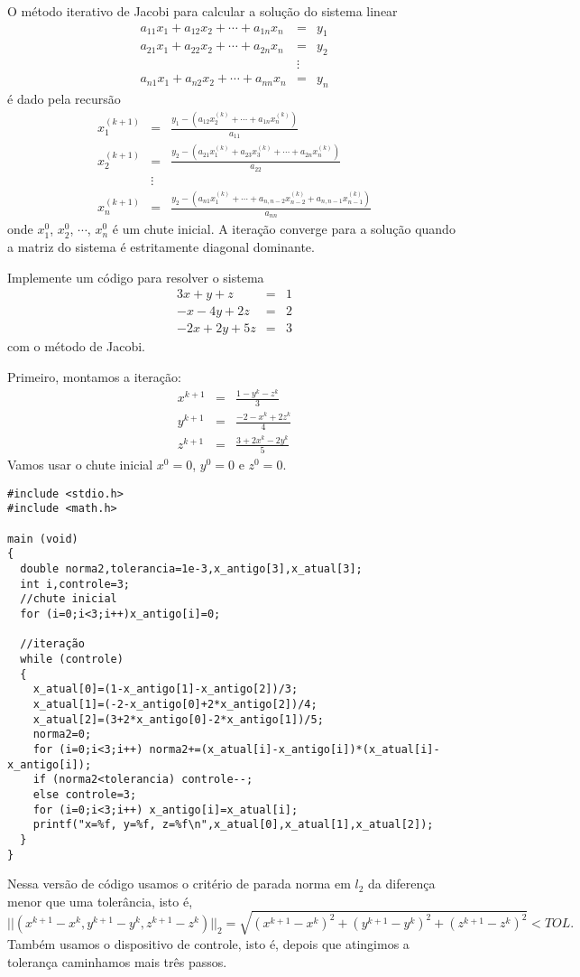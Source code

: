 \begin{ex}\label{ex_Jacobi}O método iterativo de Jacobi para calcular a solução do sistema linear
\begin{eqnarray}
\nonumber a_{11}x_1+a_{12}x_2+\cdots+a_{1n}x_n&=&y_1\\
\nonumber a_{21}x_1+a_{22}x_2+\cdots+a_{2n}x_n&=&y_2\\
\nonumber &\vdots&     \\
\label{sistema} a_{n1}x_1+a_{n2}x_2+\cdots+a_{nn}x_n&=& y_n
\end{eqnarray}
é dado pela recursão
\begin{eqnarray*}
x_1^{(k+1)}&=&\frac{y_1 - \left(a_{12}x_2^{(k)}+\cdots+a_{1n}x_n^{(k)}\right)}{a_{11}}\\
x_2^{(k+1)}&=&\frac{y_2 - \left(a_{21}x_1^{(k)}+a_{23}x_3^{(k)}+\cdots+a_{2n}x_n^{(k)}\right)}{a_{22}}\\
&\vdots&\\
x_n^{(k+1)}&=&\frac{y_2 - \left(a_{n1}x_1^{(k)}+\cdots+a_{n,n-2}x_{n-2}^{(k)}+a_{n,n-1}x_{n-1}^{(k)}\right)}{a_{nn}}
\end{eqnarray*}
onde $x_1^0$, $x_2^0$, $\cdots$, $x_n^0$ é um chute inicial. A iteração converge para a solução quando a matriz do sistema é estritamente diagonal dominante.

Implemente um código para resolver o sistema
\begin{eqnarray*}
3x+y+z&=&1\\
-x-4y+2z&=&2\\
-2x+2y+5z&=&3
\end{eqnarray*}
com o método de Jacobi.
\end{ex}
Primeiro, montamos a iteração:
\begin{eqnarray*}
x^{k+1}&=&\frac{1-y^{k}-z^{k}}{3}\\
y^{k+1}&=&\frac{-2-x^{k}+2z^{k}}{4}\\
z^{k+1}&=&\frac{3+2x^{k}-2y^{k}}{5}
\end{eqnarray*}
Vamos usar o chute inicial $x^0=0$, $y^0=0$ e $z^0=0$.
\begin{verbatim}
#include <stdio.h>
#include <math.h>

main (void)
{
  double norma2,tolerancia=1e-3,x_antigo[3],x_atual[3];
  int i,controle=3;
  //chute inicial
  for (i=0;i<3;i++)x_antigo[i]=0;

  //iteração
  while (controle)
  {
    x_atual[0]=(1-x_antigo[1]-x_antigo[2])/3;
    x_atual[1]=(-2-x_antigo[0]+2*x_antigo[2])/4;
    x_atual[2]=(3+2*x_antigo[0]-2*x_antigo[1])/5;
    norma2=0;
    for (i=0;i<3;i++) norma2+=(x_atual[i]-x_antigo[i])*(x_atual[i]-x_antigo[i]);
    if (norma2<tolerancia) controle--;
    else controle=3;
    for (i=0;i<3;i++) x_antigo[i]=x_atual[i];
    printf("x=%f, y=%f, z=%f\n",x_atual[0],x_atual[1],x_atual[2]);	
  }
}
\end{verbatim}
Nessa versão de código usamos o critério de parada norma em $l_2$ da diferença menor que uma tolerância, isto é,
$$
||(x^{k+1}-x^{k},y^{k+1}-y^{k},z^{k+1}-z^{k})||_2=\sqrt{(x^{k+1}-x^{k})^2+(y^{k+1}-y^{k})^2+(z^{k+1}-z^{k})^2}<TOL.
$$
Também usamos o dispositivo de controle, isto é, depois que atingimos a tolerança caminhamos mais três passos.

